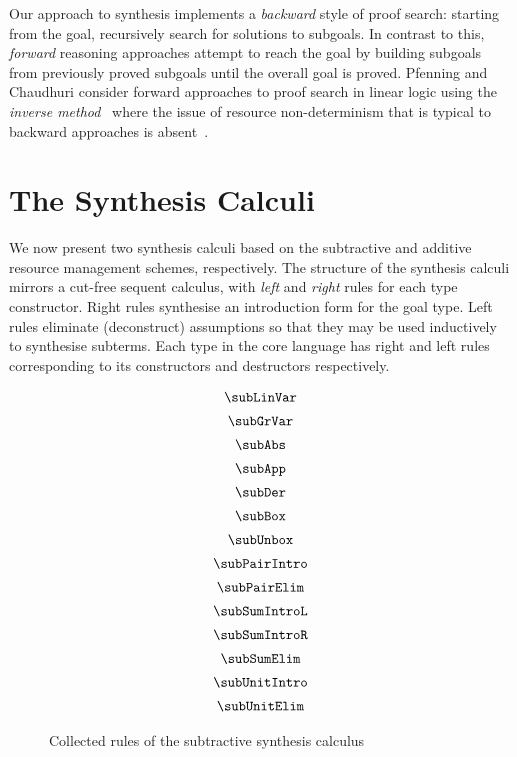 Our approach to synthesis implements a \textit{backward} style of proof search:
starting from the goal, recursively search for solutions to subgoals. In
contrast to this, \textit{forward} reasoning approaches attempt to reach the
goal by building subgoals from previously proved subgoals until the overall goal
is proved. Pfenning and Chaudhuri consider forward approaches to proof search in
linear logic using the \textit{inverse method}~\cite{DEGTYAREV2001179} where the
issue of resource non-determinism that is typical to backward approaches is
absent~\cite{10.1007/11532231_6,10.1007/11538363_15}.


\section{The Synthesis Calculi}
\label{sec:linear-base-synthesis}

We now present two synthesis calculi based on the subtractive and additive resource
management schemes, respectively. The structure of the synthesis calculi mirrors a
cut-free sequent calculus, with
\textit{left} and \textit{right} rules for each type constructor. Right rules
synthesise an introduction form for the goal type. Left rules
eliminate (deconstruct) assumptions so that they may be
used inductively to synthesise subterms. Each type in the
core language has right and left
rules corresponding to its constructors and destructors respectively.


\begin{figure}[H]
\begin{align*}
  \begin{array}{c}
    \subLinVar
    \\[0.5em]
    \subGrVar
    \\[0.5em]
    \subAbs
    \\[0.5em]
    \subApp
    \\[0.5em]
    \subDer
    \\[0.5em]
    \subBox
    \\[0.5em]
    \subUnbox
    \\[0.5em]
    \subPairIntro
    \\[0.5em]
    \subPairElim
    \\[0.5em]
    \subSumIntroL
    \\[0.5em]
    \subSumIntroR
    \\[0.5em]
    \subSumElim
    \\[0.5em]
    \subUnitIntro
    \\[0.5em]
    \subUnitElim
  \end{array}
\end{align*}
\caption{Collected rules of the subtractive synthesis calculus}
\label{fig:sub-rules}
  \end{figure}



